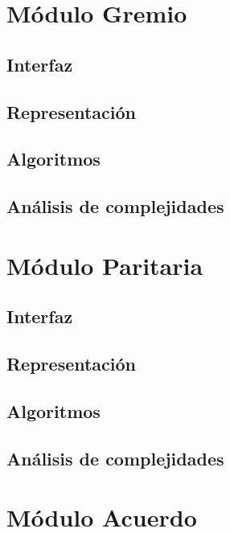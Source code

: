 \documentclass[12pt, a4paper]{article}
\begin{document}
\maketitle
\tableofcontents
\newpage

\section{Módulo Gremio} 
\subsection{Interfaz}

\subsection{Representaci\'on}

\subsection{Algoritmos}

\subsection{Análisis de complejidades}

\newpage

\section{Módulo Paritaria} 
\subsection{Interfaz}

\subsection{Representaci\'on}

\subsection{Algoritmos}

\subsection{Análisis de complejidades}

\newpage

\section{Módulo Acuerdo} 
\end{document}
